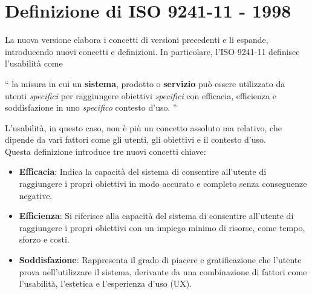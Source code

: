 \documentclass{report}
\begin{document}
	\section{Definizione di ISO 9241-11 - 1998}
	La nuova versione elabora i concetti di versioni precedenti e li espande, introducendo nuovi concetti e definizioni. In particolare, l'ISO 9241-11 definisce l'usabilità come
	\begin{center}
	\enquote{
		la misura in cui un \textbf{sistema}, prodotto o \textbf{servizio} può essere utilizzato da utenti \textit{specifici} per raggiungere obiettivi \textit{specifici} con efficacia, efficienza e soddisfazione in uno \textit{specifico} contesto d'uso.
	}
	\end{center}
	L'usabilità, in questo caso, non è più un concetto assoluto ma relativo, che dipende da vari fattori come gli utenti, gli obiettivi e il contesto d'uso.\\
	Questa definizione introduce tre nuovi concetti chiave:
	\begin{itemize}
		\item \textbf{Efficacia}: Indica la capacità del sistema di consentire all'utente di raggiungere i propri obiettivi in modo accurato e completo senza conseguenze negative.
		\item \textbf{Efficienza}: Si riferisce alla capacità del sistema di consentire all'utente di raggiungere i propri obiettivi con un impiego minimo di risorse, come tempo, sforzo e costi.
		\item \textbf{Soddisfazione}: Rappresenta il grado di piacere e gratificazione che l'utente prova nell'utilizzare il sistema, derivante da una combinazione di fattori come l'usabilità, l'estetica e l'esperienza d'uso (UX).
	\end{itemize}
\end{document}
